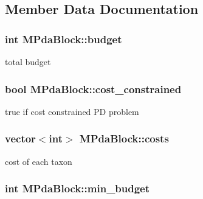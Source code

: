\subsection{Member Data Documentation}
\hypertarget{classMPdaBlock_a694b0dff038fbd8758c08bfef30adfe5}{
\subsubsection[{budget}]{\setlength{\rightskip}{0pt plus 5cm}int {\bf MPdaBlock::budget}}}
\label{classMPdaBlock_a694b0dff038fbd8758c08bfef30adfe5}
total budget \hypertarget{classMPdaBlock_ab7786c1edc907720b5f309365d6ea070}{
\subsubsection[{cost\_\-constrained}]{\setlength{\rightskip}{0pt plus 5cm}bool {\bf MPdaBlock::cost\_\-constrained}}}
\label{classMPdaBlock_ab7786c1edc907720b5f309365d6ea070}
true if cost constrained PD problem \hypertarget{classMPdaBlock_a541fd9f72745ea8c285cf1ea8aeb6074}{
\subsubsection[{costs}]{\setlength{\rightskip}{0pt plus 5cm}vector$<$int$>$ {\bf MPdaBlock::costs}}}
\label{classMPdaBlock_a541fd9f72745ea8c285cf1ea8aeb6074}
cost of each taxon \hypertarget{classMPdaBlock_a00091599a4c464c6b530b888bbefc7fd}{
\subsubsection[{min\_\-budget}]{\setlength{\rightskip}{0pt plus 5cm}int {\bf MPdaBlock::min\_\-budget}}}
\label{classMPdaBlock_a00091599a4c464c6b530b888bbefc7fd}
